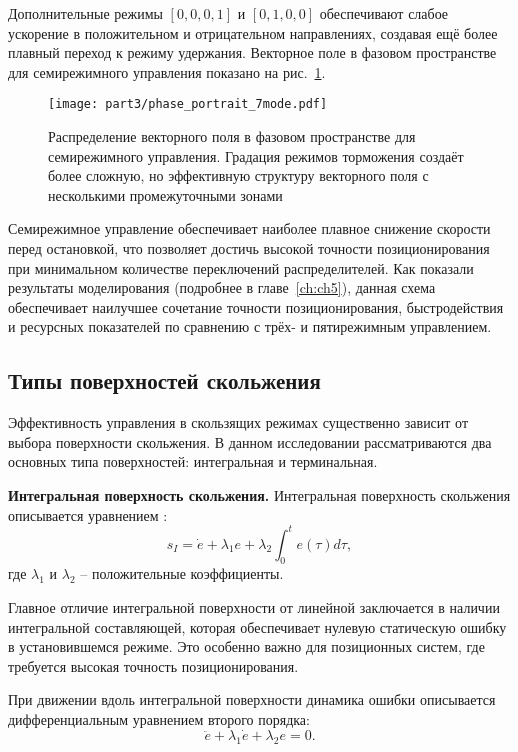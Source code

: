 Дополнительные режимы $[0,0,0,1]$ и $[0,1,0,0]$ обеспечивают слабое ускорение в положительном и
отрицательном направлениях, создавая ещё более плавный переход к режиму удержания. Векторное поле
в фазовом пространстве для семирежимного управления показано на рис.~\ref{fig:vector_field_linear_7mode}.

\begin{figure}[ht]
	\centering
	\texttt{[image: part3/phase\_portrait\_7mode.pdf]}
	\caption{Распределение векторного поля в фазовом пространстве для семирежимного управления.
		Градация режимов торможения создаёт более сложную, но эффективную структуру векторного поля
		с несколькими промежуточными зонами}
	\label{fig:vector_field_linear_7mode}
\end{figure}

Семирежимное управление обеспечивает наиболее плавное снижение скорости перед остановкой, что позволяет
достичь высокой точности позиционирования при минимальном количестве переключений распределителей.
Как показали результаты моделирования (подробнее в главе~\ref{ch:ch5}), данная схема обеспечивает наилучшее
сочетание точности позиционирования, быстродействия и ресурсных показателей по сравнению с трёх- и пятирежимным управлением.

\subsection*{Типы поверхностей скольжения}\label{subsec:ch3/sec3/sub3}

Эффективность управления в скользящих режимах существенно зависит от выбора поверхности скольжения.
В данном исследовании рассматриваются два основных типа поверхностей: интегральная и терминальная.

\textbf{Интегральная поверхность скольжения.}
Интегральная поверхность скольжения описывается уравнением \cite{sliding_surface_integral}:
\begin{equation}
	s_I = \dot{e} + \lambda_1 e + \lambda_2 \int_0^t e(\tau)d\tau,
\end{equation}
где $\lambda_1$ и $\lambda_2$ -- положительные коэффициенты.

Главное отличие интегральной поверхности от линейной заключается в наличии интегральной составляющей,
которая обеспечивает нулевую статическую ошибку в установившемся режиме. Это особенно важно для
позиционных систем, где требуется высокая точность позиционирования.

При движении вдоль интегральной поверхности динамика ошибки описывается дифференциальным уравнением второго порядка:
\begin{equation}
	\ddot{e} + \lambda_1 \dot{e} + \lambda_2 e = 0.
\end{equation}

